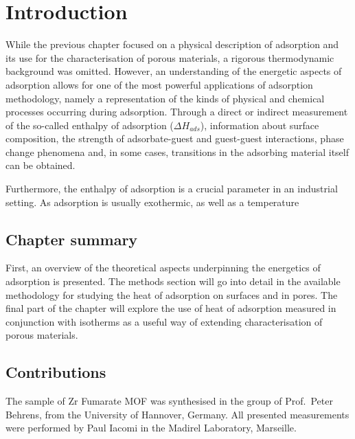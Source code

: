 
\section{Introduction}

While the previous chapter focused on a physical description
of adsorption and its use for the characterisation of 
porous materials, a rigorous thermodynamic background
was omitted. However, an understanding of the energetic
aspects of adsorption allows for one of the most powerful
applications of adsorption methodology, namely a representation
of the kinds of physical and chemical processes occurring 
during adsorption. Through a direct or indirect measurement
of the so-called enthalpy of adsorption (\(\Delta H_{ads}\)),
information about surface composition, the strength of 
adsorbate-guest and guest-guest interactions, phase change
phenomena and, in some cases, transitions in the 
adsorbing material itself can be obtained.

Furthermore, the enthalpy of adsorption is a crucial parameter
in an industrial setting. As adsorption is usually exothermic,
as well as a temperature 

\subsection*{Chapter summary}

First, an overview of the theoretical aspects underpinning 
the energetics of adsorption is presented. The methods 
section will go into detail in the available methodology
for studying the heat of adsorption on surfaces and in 
pores. The final part of the chapter will explore the use
of heat of adsorption measured in conjunction with isotherms
as a useful way of extending characterisation of porous
materials.

\subsection*{Contributions}

The sample of Zr Fumarate MOF was synthesised in the group
of Prof.\ Peter Behrens, from the University of Hannover, 
Germany. All presented measurements were performed 
by Paul Iacomi in the Madirel Laboratory, Marseille.
